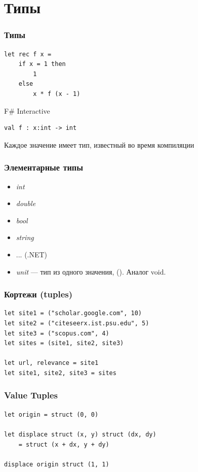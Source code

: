 \documentclass[xetex,mathserif,serif]{beamer}
\begin{document}
	\section{Типы}
			
	\begin{frame}[fragile]
		\frametitle{Типы}
		\begin{verbatim}
let rec f x =
    if x = 1 then 
        1 
    else 
        x * f (x - 1)
		\end{verbatim}

		\begin{alertblock}{F\# Interactive}
			\begin{verbatim}
val f : x:int -> int
			\end{verbatim}
		\end{alertblock}
		Каждое значение имеет тип, известный во время компиляции
\end{frame}

	\begin{frame}
		\frametitle{Элементарные типы}
		\begin{itemize}
			\item \textit{int}
			\item \textit{double}
			\item \textit{bool}
			\item \textit{string}
			\item ... (.NET)
			\item \textit{unit} --- тип из одного значения, (). Аналог void.
		\end{itemize}
	\end{frame}
	
	\begin{frame}[fragile]
		\frametitle{Кортежи (tuples)}
		\begin{verbatim}
let site1 = ("scholar.google.com", 10)
let site2 = ("citeseerx.ist.psu.edu", 5)
let site3 = ("scopus.com", 4)
let sites = (site1, site2, site3)

let url, relevance = site1
let site1, site2, site3 = sites
		\end{verbatim}
	\end{frame}

	\begin{frame}[fragile]
		\frametitle{Value Tuples}
		\begin{verbatim}
let origin = struct (0, 0)

let displace struct (x, y) struct (dx, dy)
    = struct (x + dx, y + dy)

displace origin struct (1, 1)
		\end{verbatim}
	\end{frame}
\end{document}
